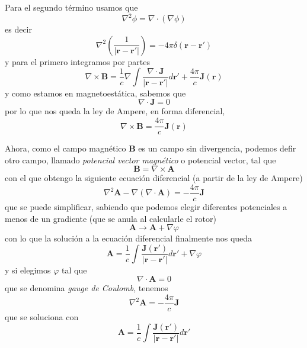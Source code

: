 ﻿\documentclass{article}
\numberwithin{equation}{section} %
\renewcommand{\vec}[1]{\boldsymbol{#1}}
\newcommand{\rinv}{\frac{1}{|\vec{r} - \vec{r}'|}}
\begin{document}
Para el segundo término usamos que 
\begin{equation}
    \nabla^2 \phi = \nabla \cdot (\nabla \phi)
\end{equation}
es decir
\begin{equation}
    \nabla^2 \left(\rinv\right) = - 4\pi \delta(\vec{r} - \vec{r}')
\end{equation}
y para el primero integramos por partes
\[ \nabla \times \vec{B} = \frac{1}{c} \nabla \int \frac{\nabla \cdot \vec{J}}{|\vec{r} - \vec{r}'|} d\vec{r}' + \frac{4\pi}{c} \vec{J}(\vec{r})\]
y como estamos en magnetoestática, sabemos que
\begin{equation}
\nabla \cdot \vec{J} = 0
\end{equation}
por lo que nos queda la ley de Ampere, en forma diferencial,
\begin{equation}
\nabla \times \vec{B} = \frac{4\pi}{c} \vec{J}(\vec{r})
\label{eq:ampere}
\end{equation}

Ahora, como el campo magnético $\vec{B}$ es un campo sin divergencia, podemos defir otro campo, llamado \emph{potencial vector magnético} o potencial vector, tal que
\begin{equation}
\vec{B} = \nabla \times \vec{A}
\end{equation}
con el que obtengo la siguiente ecuación diferencial (a partir de la ley de Ampere)
\begin{equation}
\nabla^2 \vec{A} - \nabla (\nabla \cdot \vec{A}) = - \frac{4\pi}{c} \vec{J}
\end{equation}
que se puede simplificar, sabiendo que podemos elegir diferentes potenciales a menos de un gradiente (que se anula al calcularle el rotor)
\begin{equation}
\vec{A} \to \vec{A} + \nabla \varphi
\label{eq:gauge_A}
\end{equation}
con lo que la solución a la ecuación diferencial finalmente nos queda
\begin{equation}
\vec{A} = \frac{1}{c} \int  \frac{\vec{J}(\vec{r}')}{|\vec{r} - \vec{r}'|} d\vec{r}' + \nabla \varphi
\end{equation}
y si elegimos $\varphi$ tal que
\begin{equation}
\nabla \cdot \vec{A} = 0
\label{eq:gauge_coulumb}
\end{equation}
que se denomina \emph{gauge de Coulomb}, tenemos
\begin{equation}
\nabla^2 \vec{A} = - \frac{4\pi}{c} \vec{J}
\end{equation}
que se soluciona con
\begin{equation}
\vec{A} = \frac{1}{c} \int  \frac{\vec{J}(\vec{r}')}{|\vec{r} - \vec{r}'|} d\vec{r}'
\end{equation}
\end{document}
